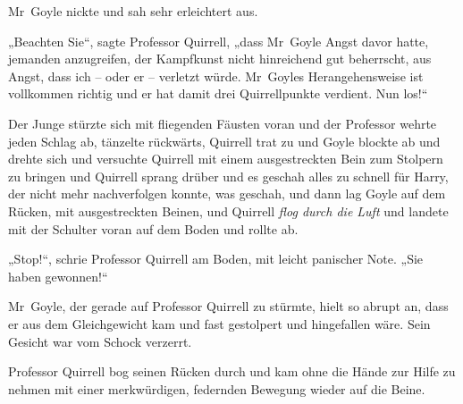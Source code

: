 Mr~Goyle nickte und sah sehr erleichtert aus.

„Beachten Sie“, sagte Professor Quirrell, „dass Mr~Goyle Angst davor hatte, jemanden anzugreifen, der Kampfkunst nicht hinreichend gut beherrscht, aus Angst, dass ich – oder er – verletzt würde. Mr~Goyles Herangehensweise ist vollkommen richtig und er hat damit drei Quirrellpunkte verdient. Nun los!“

Der Junge stürzte sich mit fliegenden Fäusten voran und der Professor wehrte jeden Schlag ab, tänzelte rückwärts, Quirrell trat zu und Goyle blockte ab und drehte sich und versuchte Quirrell mit einem ausgestreckten Bein zum Stolpern zu bringen und Quirrell sprang drüber und es geschah alles zu schnell für Harry, der nicht mehr nachverfolgen konnte, was geschah, und dann lag Goyle auf dem Rücken, mit ausgestreckten Beinen, und Quirrell \emph{flog durch die Luft} und landete mit der Schulter voran auf dem Boden und rollte ab.

„Stop!“, schrie Professor Quirrell am Boden, mit leicht panischer Note. „Sie haben gewonnen!“

Mr~Goyle, der gerade auf Professor Quirrell zu stürmte, hielt so abrupt an, dass er aus dem Gleichgewicht kam und fast gestolpert und hingefallen wäre. Sein Gesicht war vom Schock verzerrt.

Professor Quirrell bog seinen Rücken durch und kam ohne die Hände zur Hilfe zu nehmen mit einer merkwürdigen, federnden Bewegung wieder auf die Beine.

